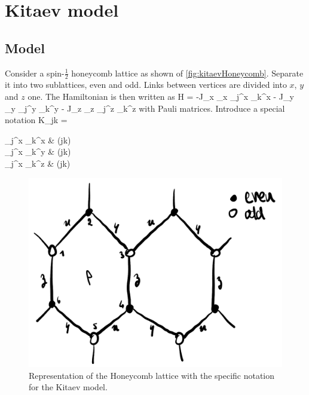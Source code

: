 \chapter{Kitaev model}

	\section{Model}

		Consider a spin-$\frac 1 2$ honeycomb lattice as shown of \autoref{fig:kitaevHoneycomb}. Separate it into two sublattices, even and odd. Links between vertices are divided into $x$, $y$ and $z$ one. The Hamiltonian is then written as
		\be \mc H = -J_x \sum_{x} \sigma_j^x \sigma_k^x - J_y \sum_{y} \sigma_j^y \sigma_k^y - J_z \sum_{z} \sigma_j^z \sigma_k^z \ee
		with Pauli matrices. Introduce a special notation
		\be K_{jk} = \begin{cases} \sigma_j^x \sigma_k^x &  (jk)  \\ \sigma_j^x \sigma_k^y &  (jk)  \\ \sigma_j^x \sigma_k^z &  (jk)  \end{cases} \ee

		\begin{figure}[h!]
            \centering
            \includegraphics[scale=0.2]{graphs/kitaevHoneycomb.png}
            \caption{Representation of the Honeycomb lattice with the specific notation for the Kitaev model.}
            \label{fig:kitaevHoneycomb}
        \end{figure}

